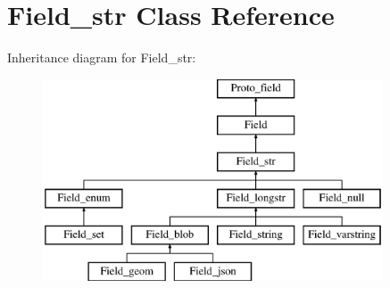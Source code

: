 \hypertarget{classField__str}{}\section{Field\+\_\+str Class Reference}
\label{classField__str}
Inheritance diagram for Field\+\_\+str\+:\begin{figure}[H]
\begin{center}
\leavevmode
\includegraphics[height=6.000000cm]{classField__str}
\end{center}
\end{figure}

